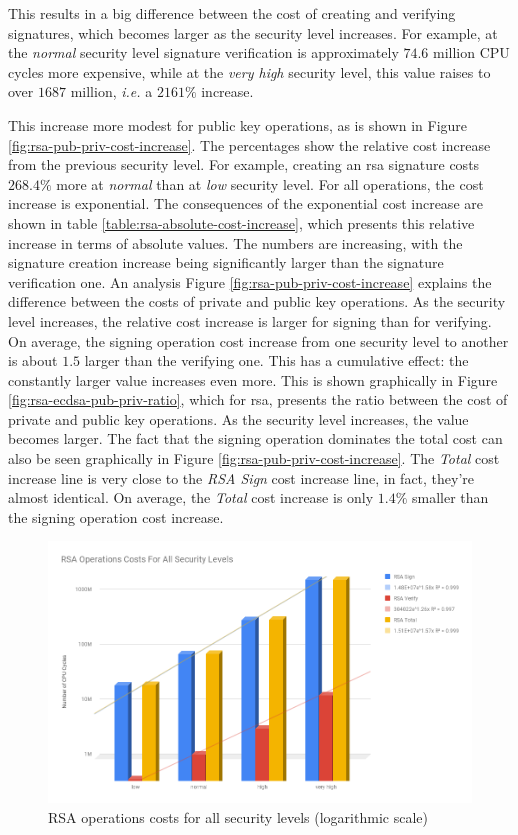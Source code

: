 This results in a big difference between the cost of creating and verifying signatures, which becomes larger as the security level increases.
For example, at the \textit{normal} security level signature verification is approximately $74.6$ million CPU cycles more expensive,
while at the \textit{very high} security level, this value raises to over $1687$ million, \textit{i.e.} a $2161\%$ increase.

This increase more modest for public key operations, as is shown in Figure \ref{fig:rsa-pub-priv-cost-increase}.
The percentages show the relative cost increase from the previous security level. For example, creating an \gls{rsa} signature costs
$268.4\%$ more at \textit{normal} than at \textit{low} security level. For all operations, the cost increase is exponential.
The consequences of the exponential cost increase are shown in table \ref{table:rsa-absolute-cost-increase}, which presents this relative increase
in terms of absolute values. The numbers are increasing, with the signature creation increase being significantly larger
than the signature verification one. An analysis Figure \ref{fig:rsa-pub-priv-cost-increase}
explains the difference between the costs of private and public key operations. As the security level increases, the relative cost
increase is larger for signing than for verifying. On average, the signing operation cost increase from one security level to another
is about $1.5$ larger than the verifying one. This has a cumulative effect: the constantly larger value increases even more.
This is shown graphically in Figure \ref{fig:rsa-ecdsa-pub-priv-ratio}, which for \gls{rsa}, presents the ratio between the cost of private and
public key operations. As the security level increases, the value becomes larger. The fact that the signing operation dominates the total cost
can also be seen graphically in Figure \ref{fig:rsa-pub-priv-cost-increase}. The \textit{Total} cost increase line is very close to the
\textit{RSA Sign} cost increase line, in fact, they're almost identical. On average, the \textit{Total} cost increase is only $1.4\%$ smaller
than the signing operation cost increase.

\begin{figure}
  \centering
  \includegraphics[width=1.0\textwidth]{img/rsa_cost_all_sls.png}
  \centering \caption{\label{fig:rsa-costs-all-sls} RSA operations costs for all security levels (logarithmic scale)}
\end{figure}

